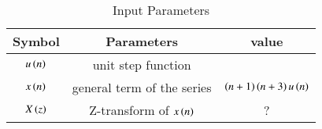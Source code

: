\setlength{\arrayrulewidth}{0.2mm}
\setlength{\tabcolsep}{15pt}
\renewcommand{\arraystretch}{1.15}


\begin{table}[ht]
  \centering
  \begin{tabular}{|c|c|c|}
    \hline
    	Symbol & Parameters & value\\
    \hline
	  $u\left(n\right)$ & unit step function &  \\
    \hline
	  $x\left(n\right)$ & general term of the series & $\left(n+1\right)\left(n+3\right)u\left(n\right)$ \\
    \hline 
	 $X\left(z\right)$ & Z-transform of $x\left(n\right)$ & ? \\
    \hline
  \end{tabular}
  \vspace{0.3cm}
  \caption{Input Parameters}
  \label{tab:1.11.9.1.1}
\end{table}
